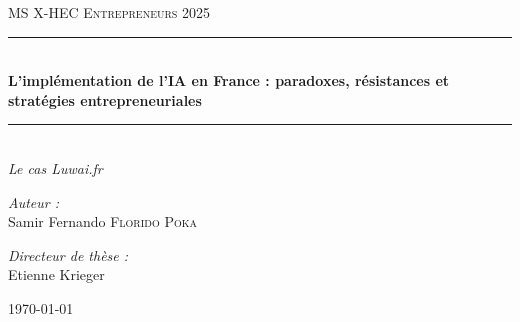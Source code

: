 \documentclass[12pt,a4paper]{report}
\numberwithin{figure}{chapter}
\numberwithin{table}{chapter}
\newcommand{\HRule}{\rule{\linewidth}{0.5mm}}
\begin{document}
\begin{titlepage}
\begin{center}

\begin{figure}[H]
    \centering
    \begin{minipage}{0.45\textwidth}
        \centering
    \end{minipage}\hfill
    \begin{minipage}{0.45\textwidth}
        \centering
    \end{minipage}
\end{figure}

\vspace{2cm}

\textsc{\LARGE MS X-HEC Entrepreneurs 2025}\\[1.5cm]

\HRule \\[0.4cm]
{\huge \bfseries L'implémentation de l'IA en France : paradoxes, résistances et stratégies entrepreneuriales}\\[0.4cm]
\HRule \\[1.5cm]

{\Large \textit{Le cas Luwai.fr}}\\[2cm]

\noindent
\begin{minipage}{0.48\textwidth}
    \begin{flushleft} \large
        \emph{Auteur :}\\
        Samir Fernando \textsc{Florido Poka}
    \end{flushleft}
\end{minipage}%
\hfill
\begin{minipage}{0.48\textwidth}
    \begin{flushright} \large
        \emph{Directeur de thèse :} \\
        Etienne Krieger
    \end{flushright}
\end{minipage}

\vfill

{\large \today}

\end{center}
\end{titlepage}
\end{document}
